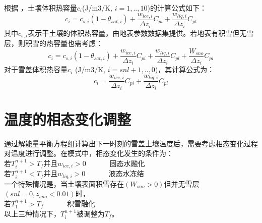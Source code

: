 根据 \citet{de1963thermal}，土壤体积热容量$c_i$(J/m3/K, $i=1,..,10$)的计算公式如下：
\begin{equation}
c_{i}=c_{s, i}\left(1-\theta_{sat, i}\right)+\frac{w_{ice, i}}{\Delta z_{i}} C_{pi}+\frac{w_{liq, i}}{\Delta z_{i}} C_{p l}
\end{equation}
其中$c_{s,i}$表示干土壤的体积热容量，由地表参数数据集提供。若地表有积雪但无雪层，则积雪的热容量也需考虑：
\begin{equation}
c_{i}=c_{s,i}\left(1-\theta_{sat, i}\right)+\frac{w_{ice, i}}{\Delta z_{i}} C_{pi}+\frac{w_{liq,i}}{\Delta z_{i}} C_{pl}+\frac{W_{sno}}{\Delta z_{i}} C_{pi}
\end{equation}
对于雪盖体积热容量$c_i$ (J/m3/K, $i=snl+1,..,0$)，其计算公式为：
\begin{equation}
c_{i}=\frac{w_{ice, i}}{\Delta z_{i}} C_{pi}+\frac{w_{liq, i}}{\Delta z_{i}} C_{pl}
\end{equation}


\section{温度的相态变化调整}
通过解能量平衡方程组计算出下一时刻的雪盖土壤温度后，需要考虑相态变化过程对温度进行调整。在模式中，相态变化发生的条件为：\\
若$T_i^{n+1}>T_f$并且$w_{ice,i}>0$ \ \   \ \  \ \   固态水融化\\
若$T_i^{n+1}<T_f$并且$w_{liq,i}>0$  \ \   \ \  \ \         液态水冻结\\
一个特殊情况是，当土壤表面积雪存在$\left(W_{sno}>0\right)$但并无雪层$\left(snl=0,z_{sno}<0.01\right)$时，\\
若$T_1^{n+1}>T_f$      \ \   \ \  \ \                 积雪融化\\
以上三种情况下，$T_i^{n+1}$被调整为$T_f$。


